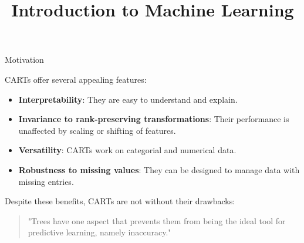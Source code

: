 \documentclass[11pt,compress,t,notes=noshow, xcolor=table]{beamer}
\title{Introduction to Machine Learning}
\begin{document}

\begin{vbframe}{Motivation}

CARTs offer several appealing features:

\begin{itemize}
  \item \textbf{Interpretability}: They are easy to understand and explain.
  \item \textbf{Invariance to rank-preserving transformations}: Their performance is unaffected by scaling or shifting of features.
  \item \textbf{Versatility}: CARTs work on categorial and numerical data.
  \item \textbf{Robustness to missing values}: They can be designed to manage data with missing entries.
\end{itemize}

\vspace{1em}
Despite these benefits, CARTs are not without their drawbacks:
\vspace{1em}

\begin{quotation}
"Trees have one aspect that prevents them from being the ideal tool for predictive learning, namely inaccuracy."
\end{quotation}

\end{vbframe}
\end{document}
